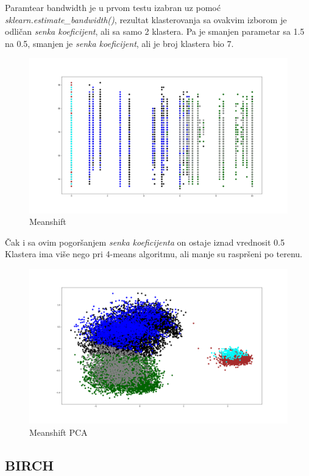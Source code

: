 \documentclass[a4paper, 11pt]{article}
\begin{document}
Paramtear bandwidth je u prvom testu izabran uz pomo\'{c}
\emph{sklearn.estimate\_bandwidth()}, rezultat klasterovanja
sa ovakvim izborom je odli\v{c}an \emph{senka koeficijent},
ali sa samo 2 klastera.
Pa je smanjen parametar sa 1.5 na 0.5, smanjen je \emph{senka
koeficijent}, ali je broj klastera bio 7.


\begin{figure}[h]
\centering
\graphicspath{{../}}
\includegraphics[scale=0.2]{meanshift_bandwith05.png}
\caption{Meanshift}
\end{figure}

\v{C}ak i sa ovim pogor\v{s}anjem \emph{senka koeficijenta}
on ostaje iznad vrednosit 0.5
Klastera ima vi\v{s}e nego pri 4-means algoritmu, ali 
manje su raspr\v{s}eni po terenu.

\begin{figure}[h]
\centering
\graphicspath{{../}}
\includegraphics[scale=0.2]{meanshift_bandwith05_pca.png}
\caption{Meanshift PCA}
\end{figure}


\subsection{BIRCH}
\end{document}
